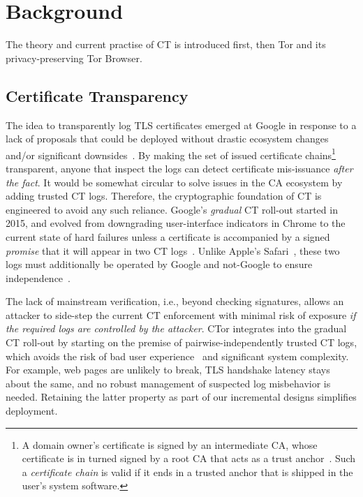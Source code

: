 \section{Background} \label{sec:background}
The theory and current practise of CT is introduced first, then Tor
and its privacy-preserving Tor Browser.

\subsection{Certificate Transparency} \label{sec:background:ct}
The idea to transparently log TLS certificates emerged at Google in response to
a lack of proposals that could be deployed without drastic ecosystem changes
and/or significant downsides~\cite{ct/a}.  By making the set of issued
certificate chains\footnote{%
	A domain owner's certificate is signed by an intermediate CA, whose
	certificate is in turned signed by a root CA that acts as a trust
	anchor~\cite{ca-ecosystem}.  Such a \emph{certificate chain} is valid if it
	ends in a trusted anchor that is shipped in the user's system software.
} transparent, anyone that inspect the logs can detect certificate
mis-issuance \emph{after the fact}.  It would be somewhat circular to solve
issues in the CA ecosystem by adding trusted CT logs.  Therefore, the
cryptographic foundation of CT is engineered to avoid any such reliance.
Google's \emph{gradual} CT roll-out started in 2015, and evolved from 
downgrading user-interface indicators in Chrome to the current state of hard
failures unless a certificate is accompanied by a signed \emph{promise} that it
will appear in two CT logs~\cite{does-ct-break-the-web}.  Unlike Apple's
Safari~\cite{safari-policy}, these two logs must additionally be operated by
Google and not-Google to ensure independence~\cite{chrome-policy}.

The lack of mainstream verification, i.e., beyond checking signatures, allows an
attacker to side-step the current CT enforcement with minimal risk of exposure
\emph{if the required logs are controlled by the attacker}.  
CTor integrates into the gradual CT roll-out by starting on the
premise of pairwise-independently trusted CT logs, which
avoids the risk of bad user experience~\cite{does-ct-break-the-web}
and significant system complexity.  For example, web pages are unlikely to
break, TLS handshake latency stays about the same, and no robust management of
suspected log misbehavior is needed.  Retaining the latter property as part of
our incremental designs simplifies deployment.

